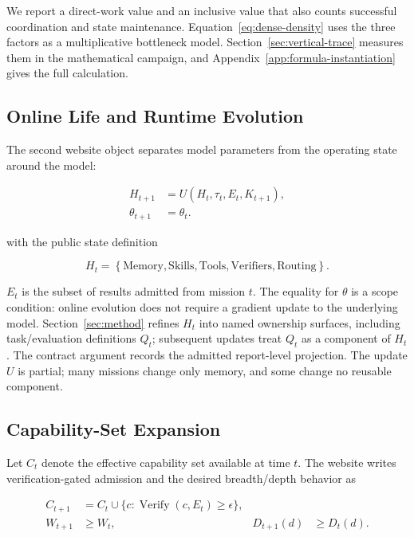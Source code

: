 We report a direct-work value and an inclusive value that also counts successful
coordination and state maintenance. Equation~\ref{eq:dense-density} uses the three
factors as a multiplicative bottleneck model. Section~\ref{sec:vertical-trace}
measures them in the mathematical campaign, and
Appendix~\ref{app:formula-instantiation} gives the full calculation.

\subsection{Online Life and Runtime Evolution}

The second website object separates model parameters from the operating state
around the model:

\begin{equation}
  \begin{aligned}
    H_{t+1} &= U(H_t,\tau_t,E_t,K_{t+1}), \\
    \theta_{t+1} &= \theta_t.
  \end{aligned}
  \label{eq:runtime-update}
\end{equation}

with the public state definition

\begin{equation}
  H_t=\left\{\text{Memory},\text{Skills},\text{Tools},
  \text{Verifiers},\text{Routing}\right\}.
  \label{eq:website-state}
\end{equation}

$E_t$ is the subset of results admitted from mission $t$. The equality for
$\theta$ is a scope condition: online evolution does not require a gradient update
to the underlying model. Section~\ref{sec:method} refines $H_t$ into named ownership
surfaces, including task/evaluation definitions $Q_t$; subsequent updates treat
$Q_t$ as a component of $H_t$.
The contract argument records the admitted report-level projection. The update $U$
is partial; many missions change only memory, and some change no reusable component.

\subsection{Capability-Set Expansion}

Let $C_t$ denote the effective capability set available at time $t$. The website
writes verification-gated admission and the desired breadth/depth behavior as

\begin{equation}
  \begin{aligned}
    C_{t+1}
      &= C_t\cup\{c:\operatorname{Verify}(c,E_t)\geq\epsilon\}, \\
    W_{t+1} &\geq W_t,
    & D_{t+1}(d) &\geq D_t(d).
  \end{aligned}
  \label{eq:ood-expansion}
\end{equation}

